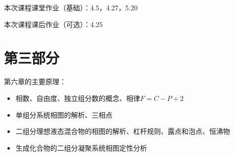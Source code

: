 \documentclass[9pt]{beamer}
\begin{document}
	\begin{frame}
	
	本次课程课堂作业（基础）：4.5，4.27，5.20
	
	\hspace*{\fill}	
	
	本次课程课后作业（可选）：4.25
	
	\end{frame}

	\section{第三部分}	
	
	\begin{frame}
	
	第六章的主要原理：
	\begin{itemize}
	
	\item 相数、自由度、独立组分数的概念、相律$F=C-P+2$
	
	\item 单组分系统相图的解析、三相点
	
	\item 二组分理想液态混合物的相图的解析、杠杆规则、露点和泡点、恒沸物
	
	\item 生成化合物的二组分凝聚系统相图定性分析
	
	\end{itemize}
	
	\end{frame}
	
\end{document}
